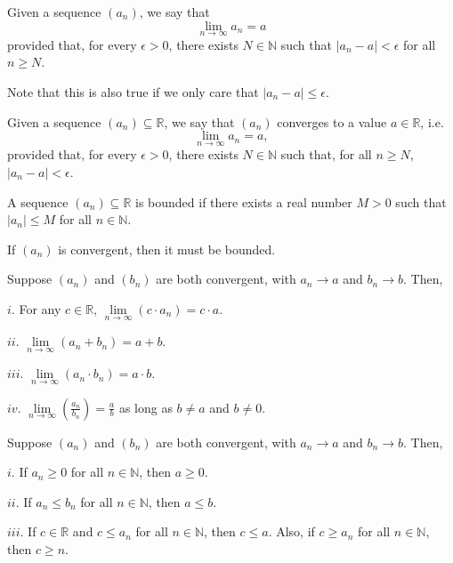 \documentclass{article}
\begin{document}
\medskip
{}

    Given a sequence $(a_n)$, we say that $$\lim_{n\to\infty}a_n = a$$ provided that, for every $\epsilon > 0$, there exists $N \in \mathbb N$ such that $|a_n - a| < \epsilon$ for all $n \geq N$.
    
    Note that this is also true if we only care that $|a_n - a| \leq \epsilon$.

\medskip
{}

    Given a sequence $(a_n) \subseteq \mathbb R$, we say that $(a_n)$ converges to a value $a \in \mathbb R$, i.e. $$\lim_{n \to \infty} a_n = a,$$ provided that, for every $\epsilon > 0$, there exists $N \in \mathbb N$ such that, for all $n \geq N$, $|a_n - a| <\epsilon$.
    
\medskip
{}

    A sequence $(a_n) \subseteq \mathbb R$ is bounded if there exists a real number $M > 0$ such that $|a_n| \leq M$ for all $n \in \mathbb N$.

\medskip
{}

    If $(a_n)$ is convergent, then it must be bounded.
    
\medskip
{}

    Suppose $(a_n)$ and $(b_n)$ are both convergent, with $a_n \to a$ and $b_n \to b$. Then,
    
    $i$. For any $c \in \mathbb R$, $\lim\limits_{n\to\infty}(c\cdot a_n) = c \cdot a$.
    
    $ii$. $\lim\limits_{n\to\infty} (a_n + b_n) = a + b$.
    
    $iii$. $\lim\limits_{n\to\infty}(a_n \cdot b_n) = a \cdot b$.
    
    $iv.$ $\lim\limits_{n\to\infty}\left(\frac{a_n}{b_n}\right) = \frac ab$ as long as $b \neq a$ and $b \neq 0$.
    
\medskip
{}

    Suppose $(a_n)$ and $(b_n)$ are both convergent, with $a_n \to a$ and $b_n \to b$. Then,
    
    $i$. If $a_n \geq 0$ for all $n \in \mathbb N$, then $a \geq 0$.
    
    $ii$. If $a_n \leq b_n$ for all $n \in \mathbb N$, then $a \leq b$.
    
    $iii$. If $c \in \mathbb R$ and $c \leq a_n$ for all $n \in \mathbb N$, then $c \leq a$. Also, if $c \geq a_n$ for all $n \in \mathbb N$, then $c \geq n$.
    
\end{document}
